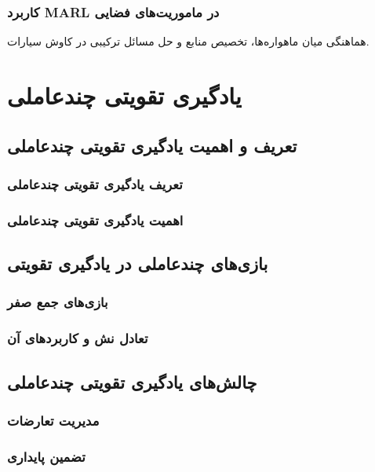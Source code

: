 \subsubsection{کاربرد MARL در ماموریت‌های فضایی}
هماهنگی میان ماهواره‌ها، تخصیص منابع و حل مسائل ترکیبی در کاوش سیارات.

\section{یادگیری تقویتی چندعاملی}

\subsection{تعریف و اهمیت یادگیری تقویتی چندعاملی}
\subsubsection{تعریف یادگیری تقویتی چندعاملی}

\subsubsection{اهمیت یادگیری تقویتی چندعاملی}

\subsection{بازی‌های چندعاملی در یادگیری تقویتی}
\subsubsection{بازی‌های جمع صفر}

\subsubsection{تعادل نش و کاربردهای آن}

\subsection{چالش‌های یادگیری تقویتی چندعاملی}
\subsubsection{مدیریت تعارضات}

\subsubsection{تضمین پایداری}

